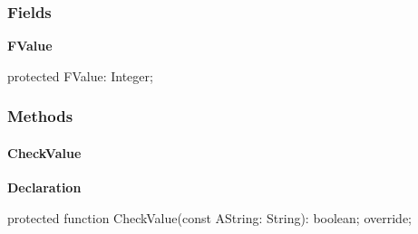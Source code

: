 \documentclass{report}
\newif\ifpdf
\begin{document}
\subsubsection*{\large{\textbf{Fields}}\normalsize\hspace{1ex}\hfill}
\begin{list}{}{
\setlength{\itemindent}{0cm}
\setlength{\listparindent}{0cm}
\setlength{\leftmargin}{\evensidemargin}
\addtolength{\leftmargin}{\tmplength}
\settowidth{\labelsep}{X}
\addtolength{\leftmargin}{\labelsep}
\setlength{\labelwidth}{\tmplength}
}
\label{PasDoc_OptionParser.TIntegerOption-FValue}
\item[\textbf{FValue}\hfill]
\ifpdf
\begin{flushleft}
\fi
\begin{ttfamily}
protected FValue: Integer;\end{ttfamily}

\ifpdf
\end{flushleft}
\fi


\par  \end{list}
\subsubsection*{\large{\textbf{Methods}}\normalsize\hspace{1ex}\hfill}
\paragraph*{CheckValue}\hspace*{\fill}

\label{PasDoc_OptionParser.TIntegerOption-CheckValue}
\begin{list}{}{
\setlength{\itemindent}{0cm}
\setlength{\listparindent}{0cm}
\setlength{\leftmargin}{\evensidemargin}
\addtolength{\leftmargin}{\tmplength}
\settowidth{\labelsep}{X}
\addtolength{\leftmargin}{\labelsep}
\setlength{\labelwidth}{\tmplength}
}
\item[\textbf{Declaration}\hfill]
\ifpdf
\begin{flushleft}
\fi
\begin{ttfamily}
protected function CheckValue(const AString: String): boolean; override;\end{ttfamily}

\ifpdf
\end{flushleft}
\fi

\end{list}
\ifpdf
\end{document}
